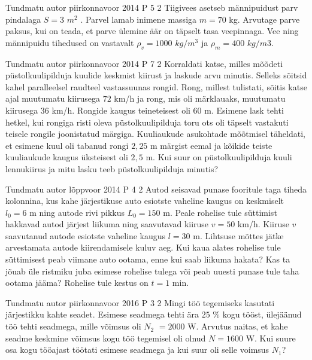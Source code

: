 \documentclass[11pt]{article}
\begin{document}
{%
{Tundmatu autor} %
{piirkonnavoor} %
{2014} %
{P 5} %
{2} %
{
\ifStatement
Tiigivees asetseb männipuidust parv pindalaga $S = 3$ $m^2$ . Parvel lamab inimene massiga $m = 70$ kg. Arvutage parve paksus, kui on teada, et parve ülemine äär on täpselt tasa veepinnaga. Vee ning männipuidu tihedused on vastavalt $\rho_v = 1000$ $kg/m^3$ ja $\rho_m = 400$ $kg/m3$.
\fi
}

{Tundmatu autor} %
{piirkonnavoor} %
{2014} %
{P 7} %
{2} %
{
\ifStatement
Korraldati katse, milles mõõdeti püstolkuulipilduja kuulide keskmist kiirust ja laskude arvu minutis. Selleks sõitsid kahel paralleelsel raudteel vastassuunas rongid. Rong, millest tulistati, sõitis katse ajal muutumatu kiirusega $72$ km/h ja rong, mis oli märklauaks, muutumatu kiirusega $36$ km/h. Rongide kaugus teineteisest oli $60$ m. Esimene lask tehti hetkel, kui rongiga risti oleva püstolkuulipilduja toru ots oli täpselt vastakuti teisele rongile joonistatud märgiga. Kuuliaukude asukohtade mõõtmisel täheldati, et esimene kuul oli tabanud rongi $2,25$ m märgist eemal ja kõikide teiste kuuliaukude kaugus üksteisest oli $2,5$ m. Kui suur on püstolkuulipilduja kuuli lennukiirus ja mitu lasku teeb püstolkuulipilduja minutis?
\fi
}

{Tundmatu autor} %
{lõppvoor} %
{2014} %
{P 4} %
{2} %
{
\ifStatement
Autod seisavad punase fooritule taga tiheda kolonnina, kus kahe järjestikuse auto esiotste vaheline kaugus on keskmiselt $l_0 = 6$ m ning autode rivi pikkus $L_0 = 150$ m. Peale rohelise tule süttimist hakkavad autod järjest liikuma ning saavutavad kiiruse $v = 50$ km/h. Kiiruse $v$ saavutanud autode esiotste vaheline kaugus $l = 30$ m. Lihtsuse mõttes jätke arvestamata autode kiirendamisele kuluv aeg. Kui kaua alates rohelise tule süttimisest peab viimane auto ootama, enne kui saab liikuma hakata? Kas ta jõuab üle ristmiku juba esimese rohelise tulega või peab uuesti punase tule taha ootama jääma? Rohelise tule kestus on $t = 1$ min. 
\fi
}

{Tundmatu autor} %
{piirkonnavoor} %
{2016} %
{P 3} %
{2} %
{
\ifStatement
Mingi töö tegemiseks kasutati järjestikku kahte seadet. Esimese seadmega tehti ära $25$ \% kogu tööst, ülejäänud töö tehti seadmega, mille võimsus oli $N_2$ $= 2000$ W. Arvutus naitas, et kahe seadme keskmine võimsus kogu töö tegemisel oli olnud $N = 1600$ W. Kui suure osa kogu tööajast töötati esimese seadmega ja kui suur oli selle voimsus $N_1$?
\fi
}

}
\end{document}
